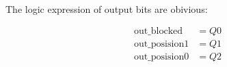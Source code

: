 \begin{multicols}{2}
\begin{align*}
        \end{align*}
        \columnbreak
    \end{multicols}

\newpage

\noindent
The logic expression of output bits are obivious:

\begin{align*}
    \text{out\_blocked} &=  Q0 \\
    \text{out\_posision1} &= Q1 \\
    \text{out\_posision0} &= Q2
\end{align*}


\newpage
